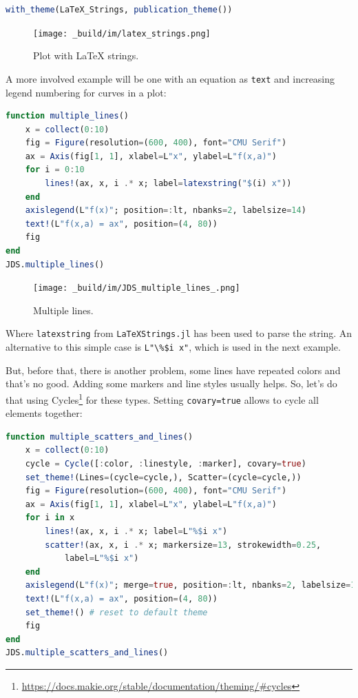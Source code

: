 \documentclass[
  notoc %
]{tufte-book}
\DeclareRobustCommand{\href}[2]{#2\footnote{\url{#1}}}
\newcommand{\passthrough}[1]{#1}
\begin{document}
\begin{lstlisting}[language=Julia]
with_theme(LaTeX_Strings, publication_theme())
\end{lstlisting}

\begin{figure}
\hypertarget{fig:latex_strings}{%
\centering
\texttt{[image: \_build/im/latex\_strings.png]}
\caption{Plot with LaTeX strings.}\label{fig:latex_strings}
}
\end{figure}

A more involved example will be one with an equation as
\passthrough{\lstinline!text!} and increasing legend numbering for
curves in a plot:

\begin{lstlisting}[language=Julia]
function multiple_lines()
    x = collect(0:10)
    fig = Figure(resolution=(600, 400), font="CMU Serif")
    ax = Axis(fig[1, 1], xlabel=L"x", ylabel=L"f(x,a)")
    for i = 0:10
        lines!(ax, x, i .* x; label=latexstring("$(i) x"))
    end
    axislegend(L"f(x)"; position=:lt, nbanks=2, labelsize=14)
    text!(L"f(x,a) = ax", position=(4, 80))
    fig
end
JDS.multiple_lines()
\end{lstlisting}

\begin{figure}
\hypertarget{fig:multiple_lines}{%
\centering
\texttt{[image: \_build/im/JDS\_multiple\_lines\_.png]}
\caption{Multiple lines.}\label{fig:multiple_lines}
}
\end{figure}

Where \passthrough{\lstinline!latexstring!} from
\passthrough{\lstinline!LaTeXStrings.jl!} has been used to parse the
string. An alternative to this simple case is
\passthrough{\lstinline!L"\%$i x"!}, which is used in the next example.

But, before that, there is another problem, some lines have repeated
colors and that's no good. Adding some markers and line styles usually
helps. So, let's do that using
\href{https://docs.makie.org/stable/documentation/theming/\#cycles}{Cycles}
for these types. Setting \passthrough{\lstinline!covary=true!} allows to
cycle all elements together:

\begin{lstlisting}[language=Julia]
function multiple_scatters_and_lines()
    x = collect(0:10)
    cycle = Cycle([:color, :linestyle, :marker], covary=true)
    set_theme!(Lines=(cycle=cycle,), Scatter=(cycle=cycle,))
    fig = Figure(resolution=(600, 400), font="CMU Serif")
    ax = Axis(fig[1, 1], xlabel=L"x", ylabel=L"f(x,a)")
    for i in x
        lines!(ax, x, i .* x; label=L"%$i x")
        scatter!(ax, x, i .* x; markersize=13, strokewidth=0.25,
            label=L"%$i x")
    end
    axislegend(L"f(x)"; merge=true, position=:lt, nbanks=2, labelsize=14)
    text!(L"f(x,a) = ax", position=(4, 80))
    set_theme!() # reset to default theme
    fig
end
JDS.multiple_scatters_and_lines()
\end{lstlisting}
\end{document}
